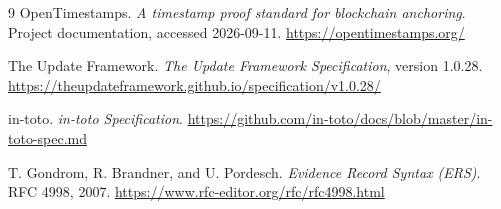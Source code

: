 \documentclass[11pt]{article}
\begin{document}
\begin{thebibliography}{9}
OpenTimestamps. \emph{A timestamp proof standard for blockchain anchoring}.
Project documentation, accessed 2026-09-11. \url{https://opentimestamps.org/}

The Update Framework. \emph{The Update Framework Specification}, version 1.0.28. \url{https://theupdateframework.github.io/specification/v1.0.28/}

in-toto. \emph{in-toto Specification}. \url{https://github.com/in-toto/docs/blob/master/in-toto-spec.md}

T. Gondrom, R. Brandner, and U. Pordesch. \emph{Evidence Record Syntax
(ERS)}. RFC 4998, 2007. \url{https://www.rfc-editor.org/rfc/rfc4998.html}
\end{thebibliography}
\end{document}
